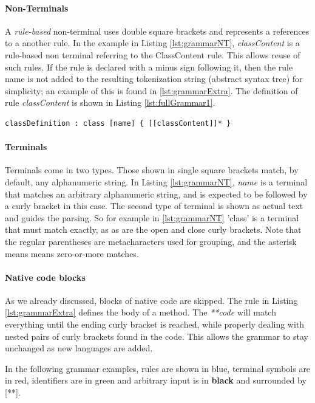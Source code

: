 \paragraph{Non-Terminals} A \textit{rule-based} non-terminal uses double square brackets and represents a references to a another rule. In the example in Listing \ref{lst:grammarNT}, \textit{classContent} is a rule-based non terminal referring to the ClassContent rule. This allows reuse of such rules.  If the rule is declared with a minus sign following it, then the rule name is not added to the resulting tokenization string (abstract syntax tree) for simplicity; an example of this is found in \ref{lst:grammarExtra}. The definition of rule \textit{classContent} is shown in Listing \ref{lst:fullGrammar1}.


\begin{lstlisting}[language={grammar}, label=lst:grammarNT,caption=Grammar for Umple classes]
 classDefinition : class [name] { [[classContent]]* }
\end{lstlisting}

\paragraph{Terminals} Terminals come in two types. Those shown in single square brackets match, by default, any alphanumeric string. In Listing \ref{lst:grammarNT}, \textit{name} is a terminal that matches an arbitrary alphanumeric string, and is expected to be followed by a curly bracket in this case. The second type of terminal is shown as actual text and guides the parsing. So for example in \ref{lst:grammarNT} 'class' is a terminal that must match exactly, as as are the open and close curly brackets. Note that the regular parentheses are metacharacters used for grouping, and the asterisk means means zero-or-more matches.

\paragraph{Native code blocks}
As we already discussed, blocks of native code are skipped. The rule in Listing \ref{lst:grammarExtra} defines the body of a method. The \textit{**code}  will match everything until the ending curly bracket is reached, while properly dealing with nested pairs of curly brackets found in the code. This allows the grammar to stay unchanged as new languages are added. 

In the following grammar examples, {\color{variableBlue}rules} are shown in blue, {\color{keywordRed}terminal} symbols are in red, {\color{stringGreen}identifiers} are in green and arbitrary input is in \textbf{black} and surrounded by [**]. 

